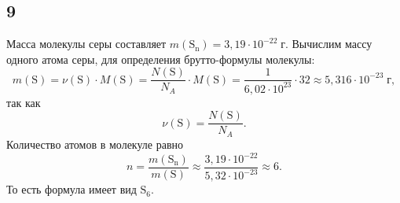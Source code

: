 \subsection{9}

Масса молекулы серы составляет $m(\mathrm{S_n})=3{,}19\cdot10^{-22}\;\text{г}$. Вычислим массу одного атома серы, для определения брутто-формулы молекулы:
\[
m(\mathrm{S})=\nu(\mathrm{S})\cdot M(\mathrm{S})=\frac{N(\mathrm{S})}{N_A}\cdot M(\mathrm{S})=\frac{1}{6{,}02\cdot10^{23}}\cdot32\approx5{,}316\cdot10^{-23}\;\text{г},
\]
так как
\[
\nu(\mathrm{S})=\frac{N(\mathrm{S})}{N_A}.
\]
Количество атомов в молекуле равно
\[
n=\frac{m(\mathrm{S_n})}{m(\mathrm{S})}\approx\frac{3{,}19\cdot10^{-22}}{5{,}32\cdot10^{-23}}\approx6.
\]
То есть формула имеет вид $\mathrm{S_6}$.
